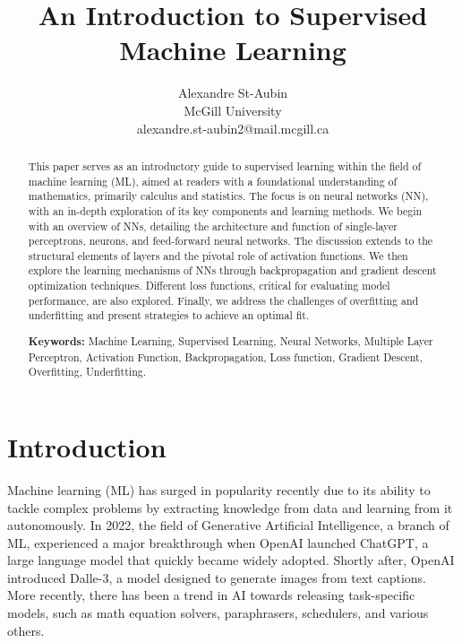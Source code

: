 \documentclass{article}
\title{An Introduction to Supervised Machine Learning}
\author{
  Alexandre St-Aubin \\
  \hspace{0.5mm} McGill University \\
  \hspace{0.5mm} alexandre.st-aubin2@mail.mcgill.ca\\
  }
\begin{document}
 
\maketitle

\begin{abstract} 

\noindent
  This paper serves as an introductory guide to supervised learning within the field of machine learning (ML), aimed at readers with a foundational understanding of mathematics, primarily calculus and statistics. The focus is on neural networks (NN), with an in-depth exploration of its key components and learning methods. We begin with an overview of NNs, detailing the architecture and function of single-layer perceptrons, neurons, and feed-forward neural networks. The discussion extends to the structural elements of layers and the pivotal role of activation functions. We then explore the learning mechanisms of NNs through backpropagation and gradient descent optimization techniques. Different loss functions, critical for evaluating model performance, are also explored. Finally, we address the challenges of overfitting and underfitting and present strategies to achieve an optimal fit. 

\vspace{5mm}


\textbf{Keywords:} Machine Learning, Supervised Learning, Neural Networks, Multiple Layer Perceptron, Activation Function, Backpropagation, Loss function, Gradient Descent, Overfitting, Underfitting.


\textbf{}

\end{abstract} 


\vfill

\clearpage

\newpage

\tableofcontents

\newpage

\section{Introduction}
Machine learning (ML) has surged in popularity recently due to its ability to tackle complex problems by extracting knowledge from data and learning from it autonomously. In 2022, the field of Generative Artificial Intelligence, a branch of ML, experienced a major breakthrough when OpenAI launched ChatGPT, a large language model that quickly became widely adopted. Shortly after, OpenAI introduced Dalle-3, a model designed to generate images from text captions. More recently, there has been a trend in AI towards releasing task-specific models, such as math equation solvers, paraphrasers, schedulers, and various others.
\end{document}
